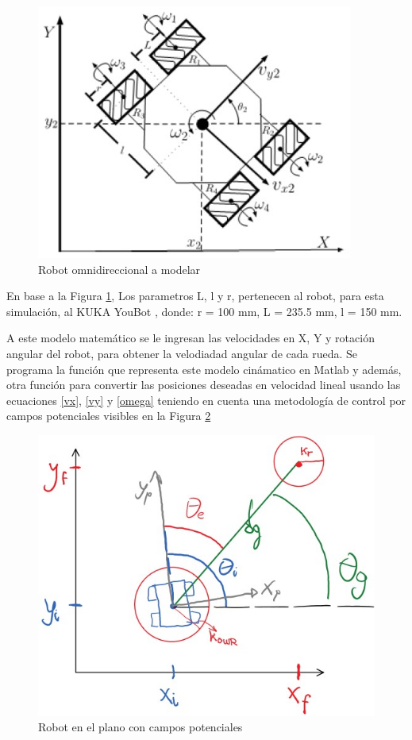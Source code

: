 \documentclass[conference]{IEEEtran}
\begin{document}
\begin{figure}
  \centering
  \includegraphics[width=0.8\linewidth]{figures/omnidirectional_robot.jpg}
  \caption{Robot omnidireccional a modelar}
  \label{fig:omnirobot}
\end{figure}

En base a la Figura \ref{fig:omnirobot}, Los parametros L, l y r, pertenecen 
al robot, para esta simulación, al KUKA YouBot \cite{noauthor_kuka_nodate},
donde: r = 100 mm, L = 235.5 mm, l = 150 mm.

A este modelo matemático se le ingresan las velocidades en X, Y y rotación angular
del robot, para obtener la velodiadad angular de cada rueda. Se programa la función 
que representa este modelo cinámatico en Matlab y además, otra función para convertir 
las posiciones deseadas en velocidad lineal usando las ecuaciones
\ref{vx}, \ref{vy} y \ref{omega} teniendo en cuenta una metodología de control por 
campos potenciales \cite{gonzalez-villela_cinematica_2015} 
visibles en la Figura \ref{fig:campospotenciales}

\begin{figure}
  \centering
  \includegraphics[width=0.9\linewidth]{figures/campos_potenciales.jpg}
  \caption{Robot en el plano con campos potenciales}
  \label{fig:campospotenciales}
\end{figure}
\end{document}
